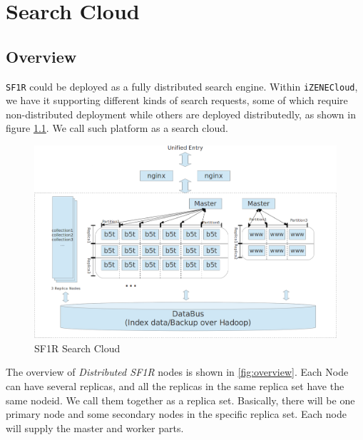 
\chapter{Search Cloud} %

\label{Chapter6} %

\section{Overview}
\texttt{SF1R} could be deployed as a fully distributed search engine. Within \texttt{iZENECloud}, we have it supporting different kinds of search requests, 
some of which require non-distributed deployment while others are deployed distributedly, as shown in figure \ref{fig:searchcloud}. We call such platform
as a search cloud.
\begin{figure}[!ht]\centering
  \includegraphics[width=.90\textwidth]{Figures/searchcloud.png}
  \caption{SF1R Search Cloud}\label{fig:searchcloud}
\end{figure}


The overview of \emph{Distributed SF1R} nodes is shown in \ref{fig:overview}. Each Node can have several replicas, and all the replicas in the same replica 
set have the same nodeid. We call them together as a replica set. Basically, there will be one primary node and some secondary nodes in the specific replica
set. Each node will supply the master and worker parts.

